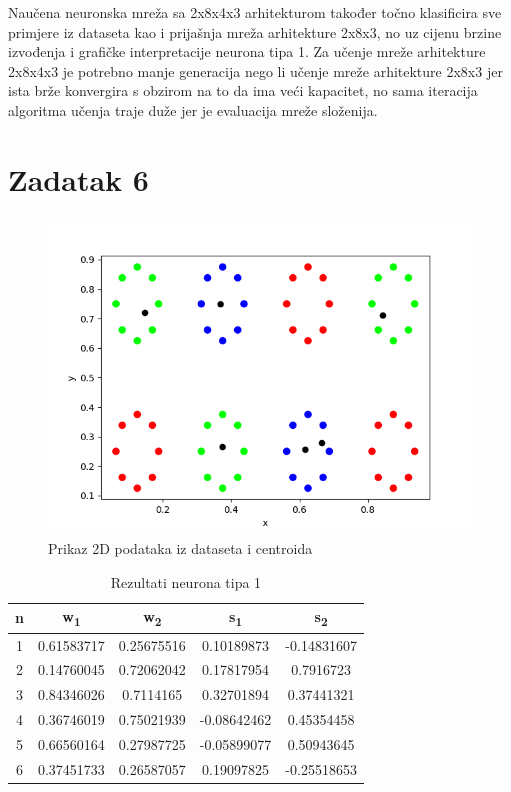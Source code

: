 \documentclass[times, utf8, seminar]{fer}
\begin{document}
Naučena neuronska mreža sa 2x8x4x3 arhitekturom također točno klasificira sve primjere iz dataseta kao i prijašnja mreža arhitekture 2x8x3, no uz cijenu brzine izvođenja i grafičke interpretacije neurona tipa 1. Za učenje mreže arhitekture 2x8x4x3 je potrebno manje generacija nego li učenje mreže arhitekture 2x8x3 jer ista brže konvergira s obzirom na to da ima veći kapacitet, no sama iteracija algoritma učenja traje duže jer je evaluacija mreže složenija.  

\chapter{Zadatak 6}
\begin{figure}[H]
    \centering
    \includegraphics[scale=0.7]{img/zad_6.png}
    \caption[Caption for LOF]{Prikaz 2D podataka iz dataseta i centroida\footnotemark}
    \label{zad6:img}
\end{figure}

\begin{table}[H]
    \centering
    \begin{tabular}{|c c c c c|} 
        \hline
        n & w\textsubscript{1} & w\textsubscript{2} & s\textsubscript{1} & s\textsubscript{2} \\ [0.5ex] 
        \hline\hline
        \rowcolor{Blue}
        1 & 0.61583717 & 0.25675516 & 0.10189873 & -0.14831607 \\
        \rowcolor{Green}
        2 & 0.14760045 & 0.72062042 & 0.17817954 & 0.7916723 \\
        \rowcolor{Green}
        3 & 0.84346026 & 0.7114165 & 0.32701894 & 0.37441321 \\
        \rowcolor{Blue}
        4 & 0.36746019 & 0.75021939 & -0.08642462 & 0.45354458 \\
        \rowcolor{Blue}
        5 & 0.66560164 & 0.27987725 & -0.05899077 & 0.50943645 \\
        \rowcolor{Green}
        6 & 0.37451733 & 0.26587057 & 0.19097825 & -0.25518653 \\ [1ex]
        \hline
    \end{tabular}
    \caption{Rezultati neurona tipa 1}
    \label{zad6:table}
\end{table}
\end{document}
